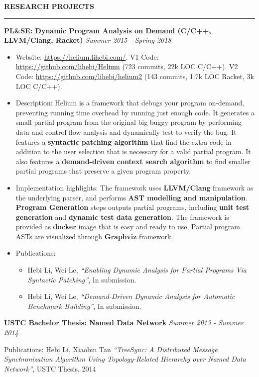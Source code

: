 \documentclass[10pt,letterpaper]{article}
\newenvironment{mysection}[1]{ %
  \medskip
  \MakeUppercase{\bf #1}
  \medskip
  \hrule
  \begin{list}{}{
      \setlength{\leftmargin}{1.5em}
    }
  \item[]
}{
  \end{list}
}
\begin{document}
\begin{mysection}{Research Projects}
  \textbf{PL\&SE: Dynamic Program Analysis on Demand (C/C++, LLVM/Clang,
    Racket)} \hfill \emph{Summer 2015 - Spring 2018}

  \begin{itemize}
  \item Website: \url{https://helium.lihebi.com/}. V1 Code:
    \url{https://github.com/lihebi/Helium} (723 commits, 22k LOC
    C/C++). V2 Code: \url{https://github.com/lihebi/helium2} (143
    commits, 1.7k LOC Racket, 3k LOC C/C++).
  \item Description: Helium is a framework that debugs your program
    on-demand, preventing running time overhead by running just enough
    code. It generates a small partial program from the original big
    buggy program by performing data and control flow analysis and
    dynamically test to verify the bug.  It features a
    \textbf{syntactic patching algorithm} that find the extra code in
    addition to the user selection that is necessary for a valid
    partial program. It also features a \textbf{demand-driven context
      search algorithm} to find smaller partial programs that preserve
    a given program property.
  \item Implementation highlights: The framework uses
    \textbf{LLVM/Clang} framework as the underlying parser, and
    performs \textbf{AST modelling and manipulation}. \textbf{Program
      Generation} steps outputs partial programs, including
    \textbf{unit test generation} and \textbf{dynamic test data
      generation}. The framework is provided as \textbf{docker} image
    that is easy and ready to use. Partial program ASTs are visualized
    through \textbf{Graphviz} framework.
  \item Publications:
    \begin{itemize}
    \item Hebi Li, Wei Le, \textit{``Enabling Dynamic Analysis for
      Partial Programs Via Syntactic Patching''}, In submission.
    \item Hebi Li, Wei Le, \textit{``Demand-Driven Dynamic Analysis
      for Automatic Benchmark Building''}, In submission.
    \end{itemize}
  \end{itemize}

  \textbf{USTC Bachelor Thesis: Named Data Network} \hfill
  \emph{Summer 2013 - Summer 2014}

  Publications: Hebi Li, Xiaobin Tan \textit{``TreeSync: A Distributed
    Message Synchronization Algorithm Using Topology-Related Hierarchy
    over Named Data Network''}, USTC Thesis, 2014
\end{mysection}
\end{document}
